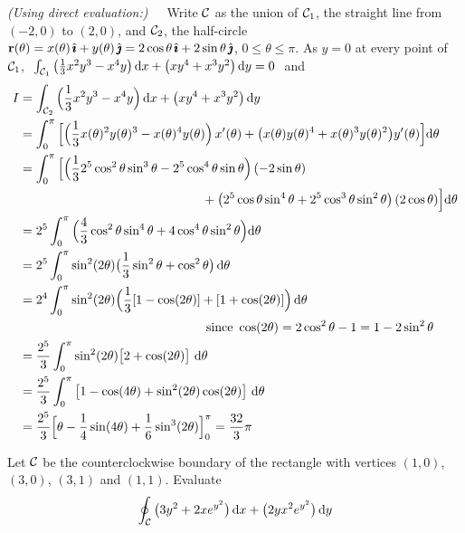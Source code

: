 \begin{solution}
\emph{(Using direct evaluation:)}\ \ \ 
Write $\mathcal{C}$ as the union of $\mathcal{C}_1$, the straight line from
$(-2,0)$ to $(2,0)$, and $\mathcal{C}_2$, the half-circle $\mathbf{r}(\theta)=x(\theta)\,\hat{\pmb{\imath}}+y(\theta)\,\hat{\pmb{\jmath}}=2\cos\theta\,\hat{\pmb{\imath}}+2\sin\theta\,\hat{\pmb{\jmath}}$,
$0\le\theta\le \pi$. As $y=0$ at every point of $\mathcal{C}_1$,
$\ 
\int_{\cC_1} \big(\frac{1}{3}x^2y^3-x^4y\big)\,\dee{x}
+\big(xy^4+x^3y^2\big)\,\dee{y}=0
\ $ and
\begin{align*}
I&=\int_{\cC_2} \Big(\frac{1}{3}x^2y^3-x^4y\Big)\,\dee{x}
+\big(xy^4+x^3y^2\big)\,\dee{y}\\
&=\int_0^\pi\Big[ \Big(\frac{1}{3}x(\theta)^2y(\theta)^3-x(\theta)^4y(\theta)\Big)\,x'(\theta)
+\big(x(\theta)y(\theta)^4+x(\theta)^3y(\theta)^2\big)y'(\theta)\Big]
          \dee{\theta}
\\
&=\int_0^\pi\Big[ \Big(\frac{1}{3}2^5\cos^2\theta\sin^3\theta-2^5\cos^4\theta\sin\theta\Big)\,
                 (-2\sin\theta)
   \\&\hskip2in
+\big(2^5\cos\theta\sin^4\theta+2^5\cos^3\theta\sin^2\theta\big)\,
               (2\cos\theta)\Big]\dee{\theta}\\
&=2^5\int_0^\pi \Big(\frac{4}{3}\cos^2\theta\sin^4\theta+4\cos^4\theta\sin^2\theta\Big)
\dee{\theta}\\
&=2^5\int_0^\pi \sin^2(2\theta)\big(\frac{1}{3}\sin^2\theta+\cos^2\theta\big)\,
\dee{\theta}\\
&=2^4\int_0^\pi \sin^2(2\theta)\Big(\frac{1}{3}[1-\cos(2\theta)]+[1+\cos(2\theta)]\Big)\,
\dee{\theta}\\
  &\hskip2in\hbox{ since }\cos(2\theta)=2\cos^2\theta-1=1-2\sin^2\theta\\
&=\frac{2^5}{3}\int_0^\pi \sin^2(2\theta)\big[2+\cos(2\theta)\big]\ \dee{\theta}\\
&=\frac{2^5}{3}\int_0^\pi \big[1-\cos(4\theta)+\sin^2(2\theta)\cos(2\theta)\big]\ \dee{\theta}\\
&=\frac{2^5}{3} \Big[\theta-\frac{1}{4}\sin(4\theta)+\frac{1}{6}\sin^3(2\theta)\Big]_0^\pi
=\frac{32}{3}\pi
\end{align*}
\end{solution}


\begin{question}[M317 2018A] %
Let $\mathcal{C}$ be the counterclockwise boundary of the rectangle
with vertices $(1,0)$, $(3,0)$, $(3,1)$ and $(1,1)$. Evaluate
\begin{equation*}
\oint_{\mathcal{C}}\big(3y^2+2xe^{y^2}\big)\,\mathrm{d}x + \big(2yx^2 e^{y^2}\big)\,\mathrm{d}y
\end{equation*}
\end{question}

